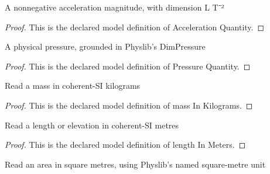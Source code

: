 \begin{definition}
  \label{def:physics:phyx-mini-0389:phyxminiproblems-problemphyxmini0389-accelerationquantity}
  A nonnegative acceleration magnitude, with dimension L T⁻²
\end{definition}
\begin{proof}
  This is the declared model definition of Acceleration Quantity.
\end{proof}
\begin{definition}
  \label{def:physics:phyx-mini-0389:phyxminiproblems-problemphyxmini0389-pressurequantity}
  A physical pressure, grounded in Physlib's DimPressure
\end{definition}
\begin{proof}
  This is the declared model definition of Pressure Quantity.
\end{proof}
\begin{definition}
  \label{def:physics:phyx-mini-0389:phyxminiproblems-problemphyxmini0389-massinkilograms}
  Read a mass in coherent-SI kilograms
\end{definition}
\begin{proof}
  This is the declared model definition of mass In Kilograms.
\end{proof}
\begin{definition}
  \label{def:physics:phyx-mini-0389:phyxminiproblems-problemphyxmini0389-lengthinmeters}
  Read a length or elevation in coherent-SI metres
\end{definition}
\begin{proof}
  This is the declared model definition of length In Meters.
\end{proof}
\begin{definition}
  \label{def:physics:phyx-mini-0389:phyxminiproblems-problemphyxmini0389-areainsquaremeters}
  Read an area in square metres, using Physlib's named square-metre unit
\end{definition}
